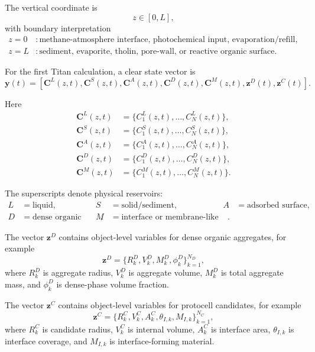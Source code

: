 \documentclass[11pt]{article}
\begin{document}
The vertical coordinate is
\begin{equation}
z\in[0,L],
\end{equation}
with boundary interpretation
\begin{align}
z=0 &: \text{methane-atmosphere interface, photochemical input, evaporation/refill},\\
z=L &: \text{sediment, evaporite, tholin, pore-wall, or reactive organic surface}.
\end{align}

For the first Titan calculation, a clear state vector is
\begin{equation}
\mathbf{y}(t)
=
\left[
\mathbf{C}^{L}(z,t),
\mathbf{C}^{S}(z,t),
\mathbf{C}^{A}(z,t),
\mathbf{C}^{D}(z,t),
\mathbf{C}^{M}(z,t),
\mathbf{z}^{D}(t),
\mathbf{z}^{C}(t)
\right].
\end{equation}

Here
\begin{align}
\mathbf{C}^{L}(z,t) &= \{C_1^L(z,t),\ldots,C_N^L(z,t)\},\\
\mathbf{C}^{S}(z,t) &= \{C_1^S(z,t),\ldots,C_N^S(z,t)\},\\
\mathbf{C}^{A}(z,t) &= \{C_1^A(z,t),\ldots,C_N^A(z,t)\},\\
\mathbf{C}^{D}(z,t) &= \{C_1^D(z,t),\ldots,C_N^D(z,t)\},\\
\mathbf{C}^{M}(z,t) &= \{C_1^M(z,t),\ldots,C_N^M(z,t)\}.
\end{align}

The superscripts denote physical reservoirs:
\begin{align}
L&=\text{liquid},&
S&=\text{solid/sediment},&
A&=\text{adsorbed surface},\nonumber\\
D&=\text{dense organic phase},&
M&=\text{interface or membrane-like phase}.
\end{align}

The vector $\mathbf{z}^{D}$ contains object-level variables for dense organic aggregates, for example
\begin{equation}
\mathbf{z}^{D}
=
\{R_k^D,V_k^D,M_k^D,\phi_k^D\}_{k=1}^{N_D},
\end{equation}
where $R_k^D$ is aggregate radius, $V_k^D$ is aggregate volume, $M_k^D$ is total aggregate mass, and $\phi_k^D$ is dense-phase volume fraction.

The vector $\mathbf{z}^{C}$ contains object-level variables for protocell candidates, for example
\begin{equation}
\mathbf{z}^{C}
=
\{R_k^C,V_k^C,A_k^C,\theta_{I,k},M_{I,k}\}_{k=1}^{N_C},
\end{equation}
where $R_k^C$ is candidate radius, $V_k^C$ is internal volume, $A_k^C$ is interface area, $\theta_{I,k}$ is interface coverage, and $M_{I,k}$ is interface-forming material.
\end{document}

